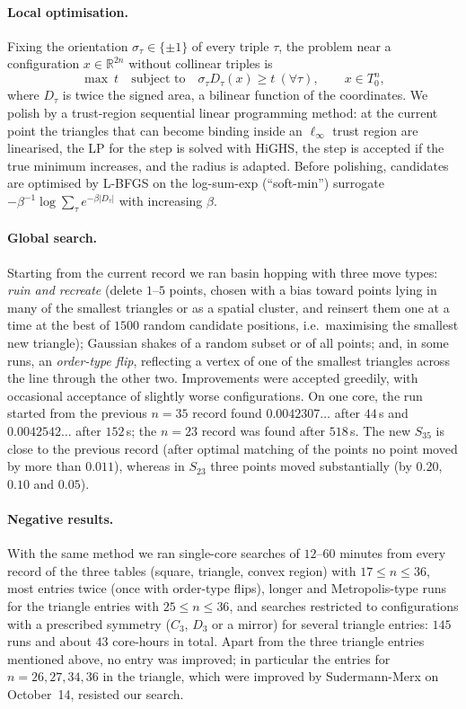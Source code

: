 \documentclass[11pt]{article}
\theoremstyle{definition}
\theoremstyle{remark}
\begin{document}
\paragraph{Local optimisation.} Fixing the orientation $\sigma_\tau\in\{\pm1\}$ of every triple
$\tau$, the problem near a configuration $x\in\mathbb R^{2n}$ without collinear triples is
\[
\max\ t\quad\text{subject to}\quad \sigma_\tau D_\tau(x)\ge t\ (\forall\tau),\qquad x\in T_0^n,
\]
where $D_\tau$ is twice the signed area, a bilinear function of the coordinates. We polish by a
trust-region sequential linear programming method: at the current point the triangles that can
become binding inside an $\ell_\infty$ trust region are linearised, the LP for the step is solved
with HiGHS, the step is accepted if the true minimum increases, and the radius is adapted. Before
polishing, candidates are optimised by L-BFGS on the log-sum-exp (``soft-min'') surrogate
$-\beta^{-1}\log\sum_\tau e^{-\beta|D_\tau|}$ with increasing $\beta$.

\paragraph{Global search.} Starting from the current record we ran basin hopping with three move
types: \emph{ruin and recreate} (delete $1$--$5$ points, chosen with a bias toward points lying in
many of the smallest triangles or as a spatial cluster, and reinsert them one at a time at the best
of $1500$ random candidate positions, i.e.\ maximising the smallest new triangle); Gaussian shakes of
a random subset or of all points; and, in some runs, an \emph{order-type flip}, reflecting a vertex of
one of the smallest triangles across the line through the other two. Improvements were accepted
greedily, with occasional acceptance of slightly worse configurations. On one core, the run started
from the previous $n=35$ record found $0.0042307\ldots$ after $44$\,s and $0.0042542\ldots$ after
$152$\,s; the $n=23$ record was found after $518$\,s. The new $S_{35}$ is close to the previous
record (after optimal matching of the points no point moved by more than $0.011$), whereas in
$S_{23}$ three points moved substantially (by $0.20$, $0.10$ and $0.05$).

\paragraph{Negative results.} With the same method we ran single-core searches of $12$--$60$ minutes
from every record of the three tables (square, triangle, convex region) with $17\le n\le36$, most
entries twice (once with order-type flips), longer and Metropolis-type runs for the triangle entries
with $25\le n\le36$, and searches restricted to configurations with a prescribed symmetry ($C_3$,
$D_3$ or a mirror) for several triangle entries: $145$ runs and about $43$ core-hours in total.
Apart from the three triangle entries mentioned above, no entry was improved; in particular the
entries for $n=26,27,34,36$ in the triangle, which were improved by Sudermann-Merx on October~14,
resisted our search.
\end{document}
